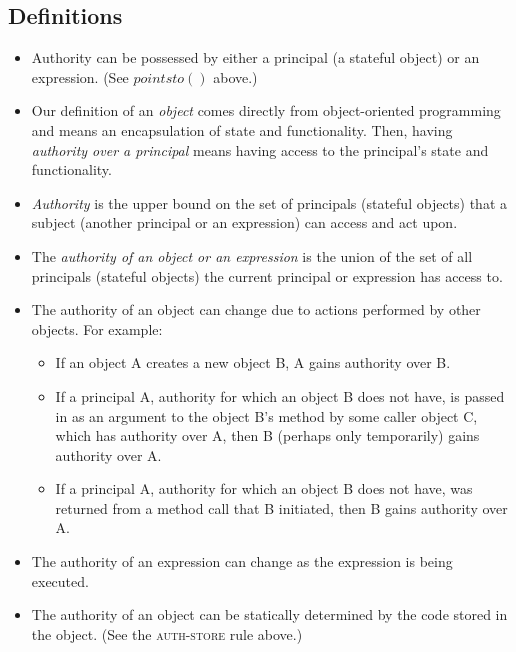 \documentclass{llncs}
\begin{document}
\subsection{Definitions}

\begin{itemize}
\item Authority can be possessed by either a principal (a stateful object) or an expression. (See $pointsto()$ above.)

\item Our definition of an \emph{object} comes directly from object-oriented programming and means an encapsulation of state and functionality. Then, having \emph{authority over a principal} means having access to the principal's state and functionality.

\item \emph{Authority} is the upper bound on the set of principals (stateful objects) that a subject (another principal or an expression) can access and act upon.

\item The \emph{authority of an object or an expression} is the union of the set of all principals (stateful objects) the current principal or expression has access to.

\item The authority of an object can change due to actions performed by other objects. For example:
\begin{itemize}
\item If an object A creates a new object B, A gains authority over B.
\item If a principal A, authority for which an object B does not have, is passed in as an argument to the object B's method by some caller object C, which has authority over A, then B (perhaps only temporarily) gains authority over A.
\item If a principal A, authority for which an object B does not have, was returned from a method call that B initiated, then B gains authority over A.
\end{itemize}

\item The authority of an expression can change as the expression is being executed.

\item The authority of an object can be statically determined by the code stored in the object. (See the \textsc{auth-store} rule above.)

\end{itemize}
\end{document}
